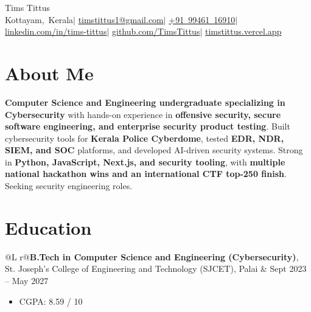 \documentclass[10pt, a4paper]{article}
\makeatletter
\newcommand{\cvname}{Tims Tittus}
\newcommand{\cvlocation}{Kottayam, Kerala}
\newcommand{\cvemail}{timstittus1@gmail.com}
\newcommand{\cvphone}{+91 99461 16910}
\newcommand{\cvlinkedin}{linkedin.com/in/tims-tittus}
\newcommand{\cvgithub}{github.com/TimsTittus}
\newcommand{\cvsite}{timstittus.vercel.app}      %
\newenvironment{highlights}{
    \begin{itemize}[topsep=0.10cm, parsep=0.10cm, partopsep=0pt, itemsep=0pt, leftmargin=10pt]
}{
    \end{itemize}
}
\newcommand{\sep}{\kern5pt$|$\kern5pt}
\newcommand{\entry}[2]{%
    \par\vspace{0.2cm}\noindent
    \begin{tabularx}{\textwidth}{@{}L r@{}}#1 & #2\end{tabularx}%
    \par\nopagebreak
}
\makeatother
\begin{document}
\begin{center}
    {\fontsize{25pt}{25pt}\selectfont \cvname}\\[6pt]
    \normalsize
    \mbox{\cvlocation}\sep
    \mbox{\href{mailto:\cvemail}{\cvemail}}\sep
    \mbox{\href{tel:\cvphone}{\cvphone}}\sep
    \mbox{\href{https://\cvlinkedin}{\cvlinkedin}}\sep
    \mbox{\href{https://\cvgithub}{\cvgithub}}\sep
    \mbox{\href{https://\cvsite}{\cvsite}}
\end{center}
\vspace{-0.2cm}

\section{About Me}
\textbf{Computer Science and Engineering undergraduate specializing in Cybersecurity} with hands-on experience in \textbf{offensive security, secure software engineering, and enterprise security product testing}. Built cybersecurity tools for \textbf{Kerala Police Cyberdome}, tested \textbf{EDR, NDR, SIEM, and SOC} platforms, and developed AI-driven security systems. Strong in \textbf{Python, JavaScript, Next.js, and security tooling}, with \textbf{multiple national hackathon wins and an international CTF top-250 finish}. Seeking security engineering roles.

\section{Education}
\entry{\textbf{B.Tech in Computer Science and Engineering (Cybersecurity)}, St. Joseph's College of Engineering and Technology (SJCET), Palai}{Sept 2023 -- May 2027}
\begin{highlights}
    \item CGPA: 8.59 / 10
\end{highlights}

\end{document}
